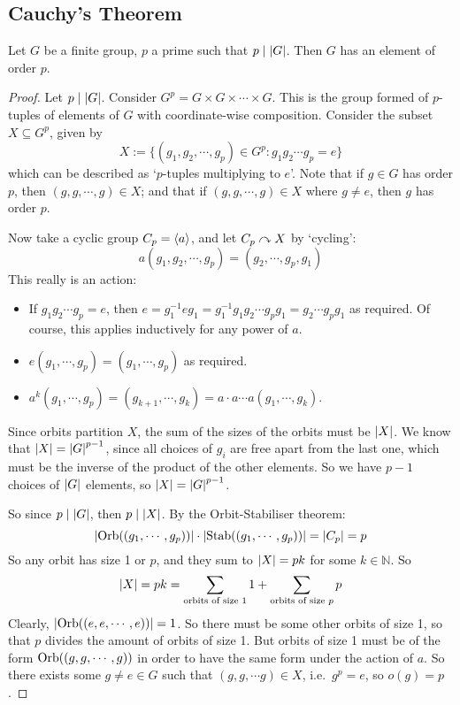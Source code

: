 \subsection{Cauchy's Theorem}
\begin{theorem}
	Let \(G\) be a finite group, \(p\) a prime such that \(p \mid \abs{G}\). Then \(G\) has an element of order \(p\).
\end{theorem}
\begin{proof}
	Let \(p \mid \abs{G}\). Consider \(G^p = G \times G \times \cdots \times G\). This is the group formed of \(p\)-tuples of elements of \(G\) with coordinate-wise composition. Consider the subset \(X \subseteq G^p\), given by
	\[ X := \{ (g_1, g_2, \cdots, g_p) \in G^p: g_1g_2\cdots g_p = e \} \]
	which can be described as `\(p\)-tuples multiplying to \(e\)'. Note that if \(g \in G\) has order \(p\), then \((g, g, \cdots, g) \in X\); and that if \((g, g, \cdots, g) \in X\) where \(g \neq e\), then \(g\) has order \(p\).

	Now take a cyclic group \(C_p = \langle{} a \rangle\), and let \(C_p \curvearrowright X\) by `cycling':
	\[ a(g_1, g_2, \cdots, g_p) = (g_2, \cdots, g_p, g_1) \]
	This really is an action:
	\begin{itemize}
		\item If \(g_1g_2 \cdots g_p = e\), then \(e = g_1^{-1} e g_1 = g_1^{-1}g_1g_2 \cdots g_p g_1 = g_2 \cdots g_pg_1\) as required. Of course, this applies inductively for any power of \(a\).
		\item \(e(g_1, \cdots, g_p) = (g_1, \cdots, g_p)\) as required.
		\item \(a^k(g_1, \cdots, g_p) = (g_{k+1}, \cdots, g_k) = a \cdot a \cdots a(g_1, \cdots, g_k)\).
	\end{itemize}
	Since orbits partition \(X\), the sum of the sizes of the orbits must be \(\abs{X}\). We know that \(\abs{X} = \abs{G}^{p-1}\), since all choices of \(g_i\) are free apart from the last one, which must be the inverse of the product of the other elements. So we have \(p-1\) choices of \(\abs{G}\) elements, so \(\abs{X} = \abs{G}^{p-1}\).

	So since \(p \mid \abs{G}\), then \(p \mid \abs{X}\). By the Orbit-Stabiliser theorem:
	\[ \abs{\operatorname{Orb}((g_1, \cdots, g_p))} \cdot \abs{\operatorname{Stab}((g_1, \cdots, g_p))} = \abs{C_p} = p \]
	So any orbit has size 1 or \(p\), and they sum to \(\abs{X} = pk\) for some \(k \in \mathbb N\). So
	\[ \abs{X} = pk = \sum_{\text{orbits of size 1}} 1 + \sum_{\text{orbits of size \(p\)}} p \]
	Clearly, \(\abs{\operatorname{Orb}((e, e, \cdots, e))} = 1\). So there must be some other orbits of size 1, so that \(p\) divides the amount of orbits of size 1. But orbits of size 1 must be of the form \(\operatorname{Orb}((g, g, \cdots, g))\) in order to have the same form under the action of \(a\). So there exists some \(g \neq e \in G\) such that \((g, g, \cdots g) \in X\), i.e.\ \(g^p = e\), so \(o(g) = p\).
\end{proof}
